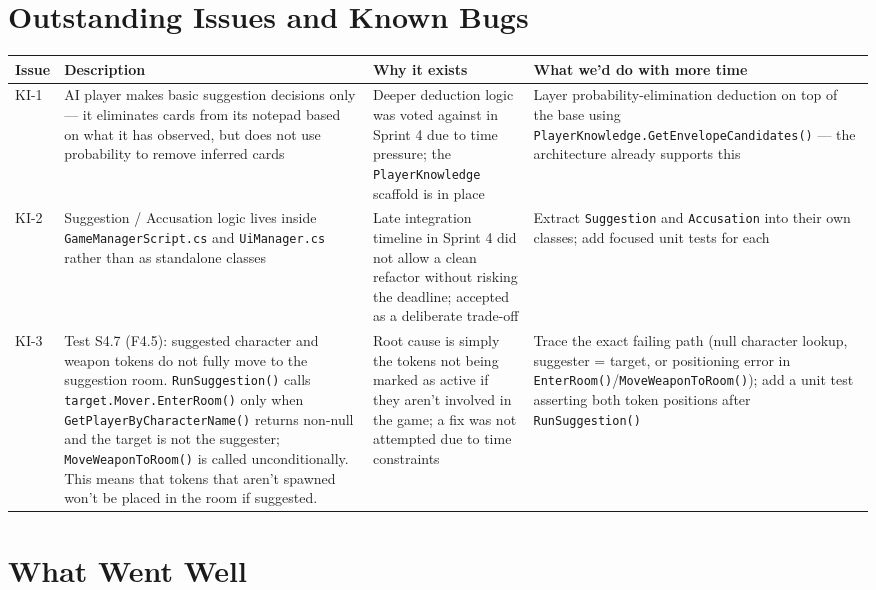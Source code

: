 \section{Outstanding Issues and Known Bugs}

\begin{longtable}{lp{4cm}p{4cm}p{4cm}}
\toprule
\textbf{Issue} & \textbf{Description} & \textbf{Why it exists} & \textbf{What we'd do with more time} \\
\midrule
\endhead
KI-1 & AI player makes basic suggestion decisions only --- it eliminates cards from its notepad based on what it has observed, but does not use probability to remove inferred cards & Deeper deduction logic was voted against in Sprint 4 due to time pressure; the \texttt{PlayerKnowledge} scaffold is in place & Layer probability-elimination deduction on top of the base using \texttt{PlayerKnowledge.GetEnvelopeCandidates()} --- the architecture already supports this \\
KI-2 & Suggestion / Accusation logic lives inside \texttt{GameManagerScript.cs} and \texttt{UiManager.cs} rather than as standalone classes & Late integration timeline in Sprint 4 did not allow a clean refactor without risking the deadline; accepted as a deliberate trade-off & Extract \texttt{Suggestion} and \texttt{Accusation} into their own classes; add focused unit tests for each \\
KI-3 & Test S4.7 (F4.5): suggested character and weapon tokens do not fully move to the suggestion room. \texttt{RunSuggestion()} calls \texttt{target.Mover.EnterRoom()} only when \texttt{GetPlayerByCharacterName()} returns non-null and the target is not the suggester; \texttt{MoveWeaponToRoom()} is called unconditionally. This means that tokens that aren't spawned won't be placed in the room if suggested. & Root cause is simply the tokens not being marked as active if they aren't involved in the game; a fix was not attempted due to time constraints & Trace the exact failing path (null character lookup, suggester = target, or positioning error in \texttt{EnterRoom()}/\texttt{MoveWeaponToRoom()}); add a unit test asserting both token positions after \texttt{RunSuggestion()} \\
\bottomrule
\end{longtable}


\section{What Went Well}

